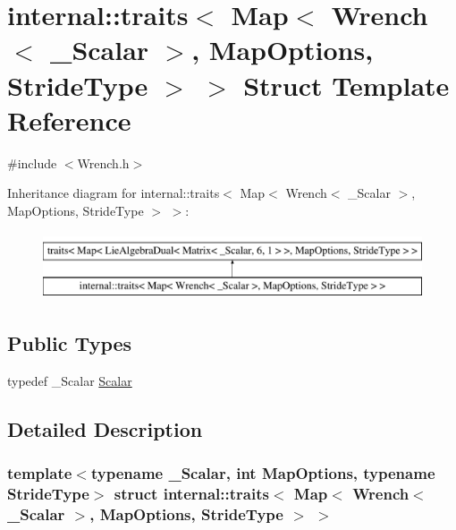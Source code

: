 \hypertarget{structinternal_1_1traits_3_01_map_3_01_wrench_3_01___scalar_01_4_00_01_map_options_00_01_stride_type_01_4_01_4}{}\section{internal\+:\+:traits$<$ Map$<$ Wrench$<$ \+\_\+\+Scalar $>$, Map\+Options, Stride\+Type $>$ $>$ Struct Template Reference}
\label{structinternal_1_1traits_3_01_map_3_01_wrench_3_01___scalar_01_4_00_01_map_options_00_01_stride_type_01_4_01_4}


{\ttfamily \#include $<$Wrench.\+h$>$}

Inheritance diagram for internal\+:\+:traits$<$ Map$<$ Wrench$<$ \+\_\+\+Scalar $>$, Map\+Options, Stride\+Type $>$ $>$\+:\begin{figure}[H]
\begin{center}
\leavevmode
\includegraphics[height=2.000000cm]{structinternal_1_1traits_3_01_map_3_01_wrench_3_01___scalar_01_4_00_01_map_options_00_01_stride_type_01_4_01_4}
\end{center}
\end{figure}
\subsection*{Public Types}
\begin{DoxyCompactItemize}
\item 
typedef \+\_\+\+Scalar \hyperlink{structinternal_1_1traits_3_01_map_3_01_wrench_3_01___scalar_01_4_00_01_map_options_00_01_stride_type_01_4_01_4_a6983b7aa4af5e3133aee4135b962a8a9}{Scalar}
\end{DoxyCompactItemize}


\subsection{Detailed Description}
\subsubsection*{template$<$typename \+\_\+\+Scalar, int Map\+Options, typename Stride\+Type$>$\newline
struct internal\+::traits$<$ Map$<$ Wrench$<$ \+\_\+\+Scalar $>$, Map\+Options, Stride\+Type $>$ $>$}



